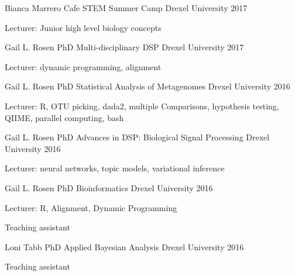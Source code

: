 



\begin{cventries}

\cventry
    {Bianca Marrero}
    {Cafe STEM Summer Camp}
    {Drexel University}
    {2017}
    {\begin{cvitems}
        \item Lecturer: Junior high level biology concepts
    \end{cvitems}}
    
\cventry
    {Gail L. Rosen PhD}
    {Multi-disciplinary DSP}
    {Drexel University}
    {2017}
    {\begin{cvitems}
        \item Lecturer: dynamic programming, alignment
    \end{cvitems}}
    
\cventry
    {Gail L. Rosen PhD}
    {Statistical Analysis of Metagenomes}
    {Drexel University}
    {2016}
    {\begin{cvitems}
        \item Lecturer: R, OTU picking, dada2, multiple Comparisons, hypothesis testing, QIIME, parallel computing, bash
    \end{cvitems}}
\cventry
    {Gail L. Rosen PhD}
    {Advances in DSP: Biological Signal Processing}
    {Drexel University}
    {2016}
    {\begin{cvitems}
        \item Lecturer: neural networks, topic models, variational inference
    \end{cvitems}}
    
\cventry
    {Gail L. Rosen PhD}
    {Bioinformatics}
    {Drexel University}
    {2016}
    {\begin{cvitems}
        \item Lecturer: R, Alignment, Dynamic Programming
        \item Teaching assistant
    \end{cvitems}}
    
\cventry
    {Loni Tabb PhD}
    {Applied Bayesian Analysis}
    {Drexel University}
    {2016}
    {\begin{cvitems}
        \item Teaching assistant
    \end{cvitems}}
    

\end{cventries}
